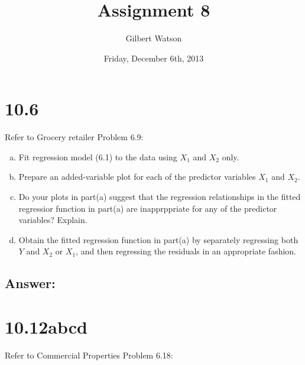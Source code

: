 \documentclass{article}
\begin{document}


\title{Assignment 8}
\author{Gilbert Watson}
\date{Friday, December 6th, 2013}





\maketitle
\tableofcontents

\section{10.6}

Refer to Grocery retailer Problem 6.9:

\begin{enumerate}[a)]
\item{} Fit regression model (6.1) to the data using $X_1$ and $X_2$ only.
\item{} Prepare an added-variable plot for each of the predictor variables $X_1$ and $X_2$.
\item{} Do your plots in part(a) suggest that the regression relationships in the fitted regressior function in part(a) are inapprppriate for any of the predictor variables? Explain.
\item{} Obtain the fitted regression function in part(a) by separately regressing both $Y$ and $X_2$ or $X_1$, and then regressing the residuals in an appropriate fashion.
\end{enumerate}

\subsection{Answer:}

\section{10.12abcd}

Refer to Commercial Properties Problem 6.18:
\end{document}
